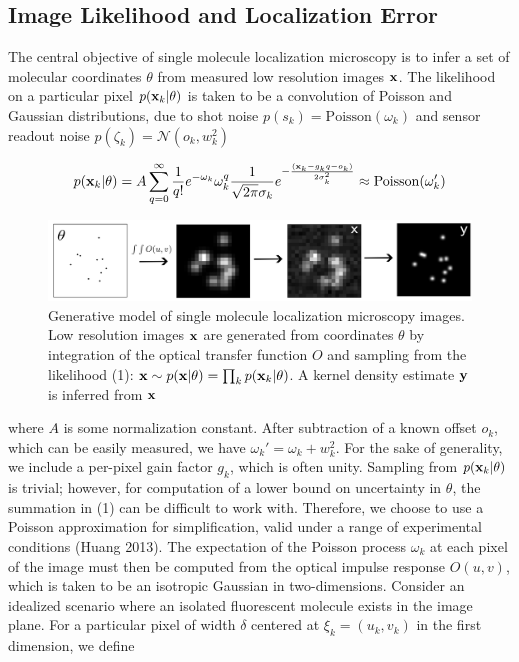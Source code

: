 \documentclass{article}
\begin{document}
\subsection{Image Likelihood and Localization Error}

The central objective of single molecule localization microscopy is to infer a set of molecular coordinates $\theta$ from measured low resolution images $\bold{x}$. The likelihood on a particular pixel $p(\bold{x}_k|\theta)$ is taken to be a convolution of Poisson and Gaussian distributions, due to shot noise $p(s_{k}) = \mathrm{Poisson}(\omega_{k})$ and sensor readout noise $p(\zeta_{k}) = \mathcal{N}(o_{k},w_{k}^{2})$ 

\begin{equation}
p(\bold{x}_{k}|\theta) = A\sum_{q=0}^{\infty} \frac{1}{q!}e^{-\omega_{k}}\omega_{k}^{q}\frac{1}{\sqrt{2\pi}\sigma_{k}}e^{-\frac{(\bold{x}_{k}-g_{k}q-o_{k})}{2\sigma_{k}^{2}}} \approx \mathrm{Poisson}(\omega_{k}')
\end{equation}


\begin{figure}
\includegraphics[scale=0.225]{Generation.png}
\caption{Generative model of single molecule localization microscopy images. Low resolution images $\bold{x}$ are generated from coordinates $\theta$ by integration of the optical transfer function $O$ and sampling from the likelihood (1): $\bold{x}\sim p(\bold{x}|\theta) = \prod_{k} p(\bold{x}_k|\theta)$. A kernel density estimate $\bold{y}$ is inferred from $\bold{x}$}
\end{figure}

where $A$ is some normalization constant. After subtraction of a known offset $o_{k}$, which can be easily measured, we have $\omega_{k}' = \omega_{k} + w_{k}^{2}$. For the sake of generality, we include a per-pixel gain factor $g_{k}$, which is often unity. Sampling from $p(\bold{x}_{k}|\theta)$ is trivial; however, for computation of a lower bound on uncertainty in $\theta$, the summation in (1) can be difficult to work with. Therefore, we choose to use a Poisson approximation for simplification, valid under a range of experimental conditions (Huang 2013). The expectation of the Poisson process $\omega_{k}$ at each pixel of the image must then be computed from the optical impulse response $O(u,v)$, which is taken to be an isotropic Gaussian in two-dimensions. Consider an idealized scenario where an isolated fluorescent molecule exists in the image plane. For a particular pixel of width $\delta$ centered at $\xi_{k}=(u_k,v_k)$ in the first dimension, we define
\end{document}

